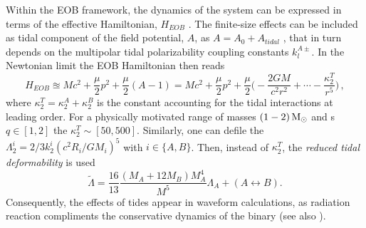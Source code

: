 Within the \ac{EOB} framework, the dynamics of the system can be expressed in terms of the 
effective Hamiltonian, $H_{EOB}$
%
.
The finite-size effects can be included as tidal component of the field potential, $A$, as 
$A = A_0 + A_{tidal}$ \citep{Bini:2012gu}, 
that in turn depends on the multipolar tidal polarizability coupling constants $k_{l}^{A\pm}$.
%
In the Newtonian limit the \ac{EOB} Hamiltonian then reads 
%
\begin{equation}
H_{EOB} \approxeq Mc^2 + \frac{\mu}{2}p^2 + \frac{\mu}{2}(A-1) = Mc^2 + \frac{\mu}{2}p^2 + 
\frac{\mu}{2}\Big( -\frac{2 G M}{c^2 r^2} + \cdots - \frac{\kappa_2^T}{r^5} \Big)\, ,
\end{equation}
%
where $\kappa_2^T = \kappa_2^A + \kappa_2^B$ is the constant accounting for the tidal 
interactions at leading order.
%
For a physically motivated range of masses $(1-2)\,{\text{M}_{\odot}}$ and \mr{}s $q\in[1,2]$ the 
$\kappa_2^T\sim[50,500]$. 
%
Similarly, one can defile the $\Lambda_2^i = 2/3 k_2^i (c^2 R_i/GM_i)^5$ with $i\in\{A,B\}$.
Then, instead of $\kappa_2^T$, the \textit{reduced tidal deformability} is used
%
\begin{equation}
\label{eq:intro:Lambda}
\tilde{\Lambda} = \frac{16}{13}\frac{(M_A + 12M_B)M_A^4}{M^5}\Lambda_A + (A\leftrightarrow B).
\end{equation}
%
Consequently, the effects of tides appear in waveform calculations, as radiation reaction 
compliments the conservative dynamics of the binary \citep{Damour:2008gu} 
(see also \citet{Damour:2012yf,Banihashemi:2018xfb}).

